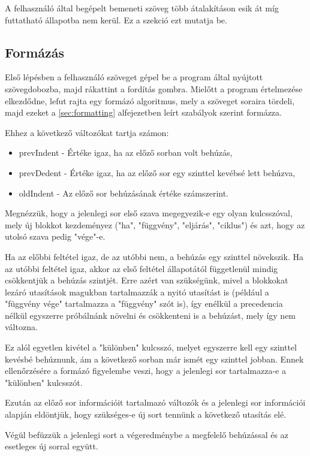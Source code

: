 A felhasználó által begépelt bemeneti szöveg több átalakításon esik át míg futtatható állapotba nem kerül. Ez a szekció ezt mutatja be.

\subsection{Formázás}

Első lépésben a felhasználó szöveget gépel be a program által nyújtott szövegdobozba, majd rákattint a fordítás gombra. Mielőtt a program értelmezése elkezdődne, lefut rajta egy formázó algoritmus, mely a szöveget soraira tördeli, majd ezeket a \ref{sec:formatting} alfejezetben leírt szabályok szerint formázza.

Ehhez a következő változókat tartja számon:

\begin{itemize}
    \item prevIndent - Értéke igaz, ha az előző sorban volt behúzás,
    \item prevDedent - Értéke igaz, ha az előző sor egy szinttel kevébsé lett behúzva,
    \item oldIndent - Az előző sor behúzásának értéke számszerint.
\end{itemize}

Megnézzük, hogy a jelenlegi sor első szava megegyezik-e egy olyan kulcsszóval, mely új blokkot kezdeményez ("ha", "függvény", "eljárás", "ciklus") és azt, hogy az utolsó szava pedig "vége"-e.

Ha az előbbi feltétel igaz, de az utóbbi nem, a behúzás egy szinttel növekszik. Ha az utóbbi feltétel igaz, akkor az első feltétel állapotától függetlenül mindig csökkentjük a behúzás szintjét. Erre azért van szükségünk, mivel a blokkokat lezáró utasítások magukban tartalmazzák a nyitó utasítást is (például a "függvény vége" tartalmazza a "függvény" szót is), így enélkül a precedencia nélkül egyszerre próbálnánk növelni és csökkenteni is a behúzást, mely így nem változna.

Ez alól egyetlen kivétel a "különben" kulcsszó, melyet egyszerre kell egy szinttel kevésbé behúznunk, ám a következő sorban már ismét egy szinttel jobban. Ennek ellenőrzésére a formázó figyelembe veszi, hogy a jelenlegi sor tartalmazza-e a "különben" kulcsszót.

Ezután az előző sor információit tartalmazó változók és a jelenlegi sor információi alapján eldöntjük, hogy szükséges-e új sort tennünk a következő utasítás elé.

Végül befüzzük a jelenlegi sort a végeredménybe a megfelelő behúzással és az esetleges új sorral együtt.

